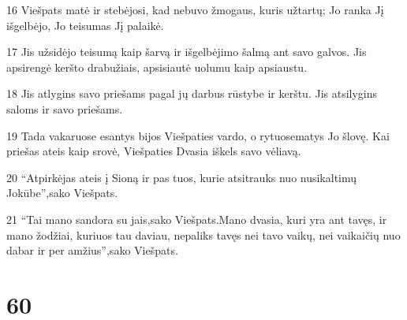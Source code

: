 \par 16 Viešpats matė ir stebėjosi, kad nebuvo žmogaus, kuris užtartų; Jo ranka Jį išgelbėjo, Jo teisumas Jį palaikė. 
\par 17 Jis užsidėjo teisumą kaip šarvą ir išgelbėjimo šalmą ant savo galvos. Jis apsirengė keršto drabužiais, apsisiautė uolumu kaip apsiaustu. 
\par 18 Jis atlygins savo priešams pagal jų darbus rūstybe ir kerštu. Jis atsilygins saloms ir savo priešams. 
\par 19 Tada vakaruose esantys bijos Viešpaties vardo, o rytuose­matys Jo šlovę. Kai priešas ateis kaip srovė, Viešpaties Dvasia iškels savo vėliavą. 
\par 20 “Atpirkėjas ateis į Sioną ir pas tuos, kurie atsitrauks nuo nusikaltimų Jokūbe”,­sako Viešpats. 
\par 21 “Tai mano sandora su jais,­sako Viešpats.­Mano dvasia, kuri yra ant tavęs, ir mano žodžiai, kuriuos tau daviau, nepaliks tavęs nei tavo vaikų, nei vaikaičių nuo dabar ir per amžius”,­sako Viešpats.



\chapter{60}


